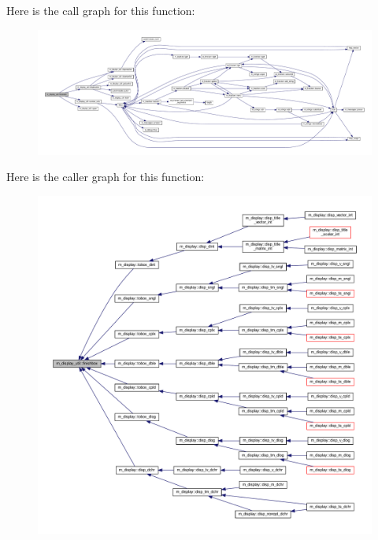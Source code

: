 Here is the call graph for this function\+:
\nopagebreak
\begin{figure}[H]
\begin{center}
\leavevmode
\includegraphics[width=350pt]{namespacem__display__util_a056732cc150994b9abe25ed0d72ebee4_cgraph}
\end{center}
\end{figure}
Here is the caller graph for this function\+:
\nopagebreak
\begin{figure}[H]
\begin{center}
\leavevmode
\includegraphics[width=350pt]{namespacem__display__util_a056732cc150994b9abe25ed0d72ebee4_icgraph}
\end{center}
\end{figure}
\mbox{\label{namespacem__display__util_a04585c4fe921b2423a6cfc1ad21a40b7}} 

